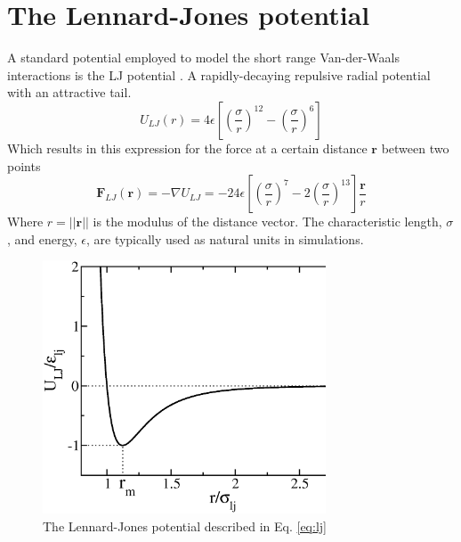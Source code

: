 \documentclass[ twoside,openright,titlepage,numbers=noenddot,%
headinclude,footinclude,cleardoublepage=empty,abstract=on,
BCOR=5mm,paper=b5,fontsize=11pt, dvipsnames
]{scrreprt}
\renewcommand{\vec}[1]{\bm{#1}}
\begin{document}
\section{The Lennard-Jones potential}\label{sec:lj}
A standard potential employed to model the short range Van-der-Waals interactions is the \gls{LJ} potential \cite{Thol2015}. A rapidly-decaying repulsive radial potential with an attractive tail.
\begin{equation}
  \label{eq:lj}
  U_{LJ}(r) = 4 \epsilon \left[ \left(\frac{\sigma}{r}\right)^{12} - \left( \frac{\sigma}{r}\right)^6 \right] 
\end{equation}
Which results in this expression for the force at a certain distance $\vec{r}$ between two points
\begin{equation}
  \label{eq:ljf}
  \vec{F}_{LJ}(\vec{r}) = -\nabla U_{LJ} = -24 \epsilon \left[ \left(\frac{\sigma}{r}\right)^{7} - 2\left( \frac{\sigma}{r}\right)^{13} \right] \frac{\vec{r}}{r}
\end{equation}
Where $r = ||\vec{r}||$ is the modulus of the distance vector. The characteristic length, $\sigma$, and energy, $\epsilon$, are typically used as natural units in simulations.
\begin{figure}
  \centering
  \includegraphics[width=0.75\textwidth]{lj}
  \caption{The Lennard-Jones potential described in Eq. \ref{eq:lj}}
  \label{fig:lj}
\end{figure}
\end{document}

